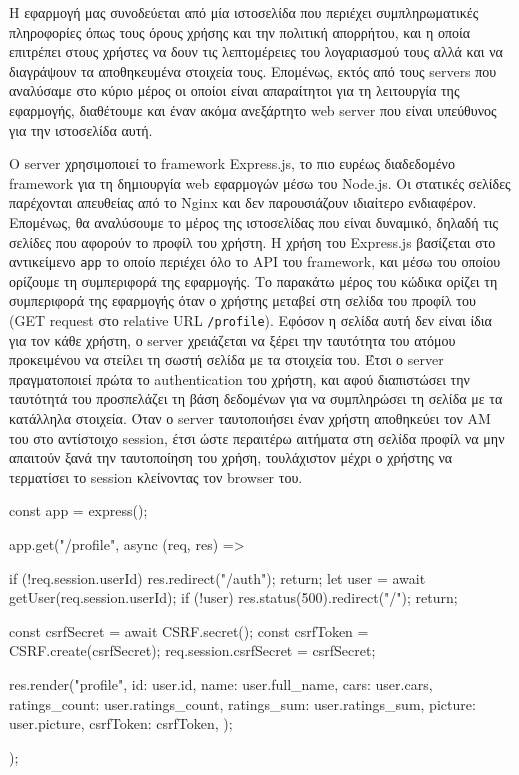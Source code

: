 \documentclass[../thesis.tex]{subfiles}
\begin{document}
Η εφαρμογή μας συνοδεύεται από μία ιστοσελίδα που περιέχει συμπληρωματικές πληροφορίες όπως τους όρους χρήσης και την πολιτική απορρήτου, και η οποία επιτρέπει στους χρήστες να δουν τις λεπτομέρειες του λογαριασμού τους αλλά και να διαγράψουν τα αποθηκευμένα στοιχεία τους.
Επομένως, εκτός από τους servers που αναλύσαμε στο κύριο μέρος οι οποίοι είναι απαραίτητοι για τη λειτουργία της εφαρμογής, διαθέτουμε και έναν ακόμα ανεξάρτητο web server που είναι υπεύθυνος για την ιστοσελίδα αυτή.

Ο server χρησιμοποιεί το framework Express.js, το πιο ευρέως διαδεδομένο framework για τη δημιουργία web εφαρμογών μέσω του Node.js.
Οι στατικές σελίδες παρέχονται απευθείας από το Nginx και δεν παρουσιάζουν ιδιαίτερο ενδιαφέρον.
Επομένως, θα αναλύσουμε το μέρος της ιστοσελίδας που είναι δυναμικό, δηλαδή τις σελίδες που αφορούν το προφίλ του χρήστη.
Η χρήση του Express.js βασίζεται στο αντικείμενο \texttt{app} το οποίο περιέχει όλο το API του framework, και μέσω του οποίου ορίζουμε τη συμπεριφορά της εφαρμογής.
Το παρακάτω μέρος του κώδικα ορίζει τη συμπεριφορά της εφαρμογής όταν ο χρήστης μεταβεί στη σελίδα του προφίλ του (GET request στο relative URL \texttt{/profile}).
Εφόσον η σελίδα αυτή δεν είναι ίδια για τον κάθε χρήστη, ο server χρειάζεται να ξέρει την ταυτότητα του ατόμου προκειμένου να στείλει τη σωστή σελίδα με τα στοιχεία του.
Έτσι ο server πραγματοποιεί πρώτα το authentication του χρήστη, και αφού διαπιστώσει την ταυτότητά του προσπελάζει τη βάση δεδομένων για να συμπληρώσει τη σελίδα με τα κατάλληλα στοιχεία.
Όταν ο server ταυτοποιήσει έναν χρήστη αποθηκεύει τον ΑΜ του στο αντίστοιχο session, έτσι ώστε περαιτέρω αιτήματα στη σελίδα προφίλ να μην απαιτούν ξανά την ταυτοποίηση του χρήση, τουλάχιστον μέχρι ο χρήστης να τερματίσει το session κλείνοντας τον browser του.

\begin{codeblock}
  const app = express();

  app.get("/profile", async (req, res) => {
    if (!req.session.userId) {
      res.redirect("/auth");
      return;
    }
    let user = await getUser(req.session.userId);
    if (!user) {
      res.status(500).redirect("/");
      return;
    }

    const csrfSecret = await CSRF.secret();
    const csrfToken = CSRF.create(csrfSecret);
    req.session.csrfSecret = csrfSecret;

    res.render("profile", {
      id: user.id,
      name: user.full_name,
      cars: user.cars,
      ratings_count: user.ratings_count,
      ratings_sum: user.ratings_sum,
      picture: user.picture,
      csrfToken: csrfToken,
    });
  });
\end{codeblock}
\end{document}
